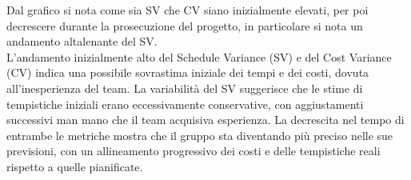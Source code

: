 Dal grafico si nota come sia SV che CV siano inizialmente elevati, per poi decrescere durante la prosecuzione del progetto, in particolare si nota un andamento altalenante del SV. \\
L'andamento inizialmente alto del Schedule Variance (SV) e del Cost Variance (CV) indica una possibile sovrastima iniziale dei tempi e dei costi, dovuta all'inesperienza del team. La variabilità del SV suggerisce che le stime di tempistiche iniziali erano eccessivamente conservative, con aggiustamenti successivi man mano che il team acquisiva esperienza. La decrescita nel tempo di entrambe le metriche mostra che il gruppo sta diventando più preciso nelle sue previsioni, con un allineamento progressivo dei costi e delle tempistiche reali rispetto a quelle pianificate.

\newpage

